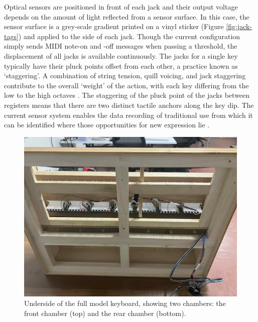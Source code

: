 Optical sensors are positioned in front of each jack and their output voltage depends on the amount of light reflected from a sensor surface. In this case, the sensor surface is a grey-scale gradient printed on a vinyl sticker (Figure \ref{fig:jack-tags}) and applied to the side of each jack. Though the current configuration simply sends MIDI note-on and -off messages when passing a threshold, the displacement of all jacks is available continuously.
The jacks for a single key typically have their pluck points offset from each other, a practice known as `staggering'.
A combination of string tension, quill voicing, and jack staggering contribute to the overall `weight' of the action, with each key differing from the low to the high octaves \cite{Veroli2012}. The staggering of the pluck point of the jacks between registers means that there are two distinct tactile anchors along the key dip. The current sensor system enables the data recording of traditional use from which it can be identified where those opportunities for new expression lie \cite{McPherson2013-2}.


\begin{figure}
  \centering
  \includegraphics[width=\linewidth]{src/images/49-key-bottom-sensors-no-keys.jpg} 
  \caption{Underside of the full model keyboard, showing two chambers: the front chamber (top) and the rear chamber (bottom).} 
  \Description{} 
  \label{fig:49-key-bottom}
\end{figure}

